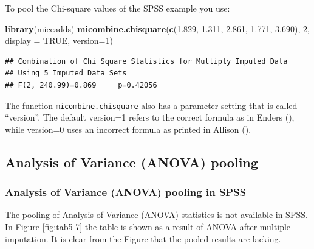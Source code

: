 \documentclass[
]{book}
\newenvironment{Shaded}{\begin{snugshade}}{\end{snugshade}}
\newcommand{\DataTypeTok}[1]{\textcolor[rgb]{0.13,0.29,0.53}{#1}}
\newcommand{\DecValTok}[1]{\textcolor[rgb]{0.00,0.00,0.81}{#1}}
\newcommand{\FloatTok}[1]{\textcolor[rgb]{0.00,0.00,0.81}{#1}}
\newcommand{\KeywordTok}[1]{\textcolor[rgb]{0.13,0.29,0.53}{\textbf{#1}}}
\newcommand{\NormalTok}[1]{#1}
\newcommand{\OtherTok}[1]{\textcolor[rgb]{0.56,0.35,0.01}{#1}}
\begin{document}
To pool the Chi-square values of the SPSS example you use:

\begin{Shaded}
\begin{Highlighting}[]
\KeywordTok{library}\NormalTok{(miceadds)}
\KeywordTok{micombine.chisquare}\NormalTok{(}\KeywordTok{c}\NormalTok{(}\FloatTok{1.829}\NormalTok{, }\FloatTok{1.311}\NormalTok{, }\FloatTok{2.861}\NormalTok{, }\FloatTok{1.771}\NormalTok{, }\FloatTok{3.690}\NormalTok{), }\DecValTok{2}\NormalTok{, }\DataTypeTok{display =} \OtherTok{TRUE}\NormalTok{, }\DataTypeTok{version=}\DecValTok{1}\NormalTok{)}
\end{Highlighting}
\end{Shaded}

\begin{verbatim}
## Combination of Chi Square Statistics for Multiply Imputed Data
## Using 5 Imputed Data Sets
## F(2, 240.99)=0.869     p=0.42056
\end{verbatim}

The function \texttt{micombine.chisquare} also has a parameter setting that is called ``version''. The default version=1 refers to the correct formula as in Enders (\citet{enders2010applied}), while version=0 uses an incorrect formula as printed in Allison (\citet{Allison2002}).

\hypertarget{analysis-of-variance-anova-pooling}{%
\subsection{Analysis of Variance (ANOVA) pooling}\label{analysis-of-variance-anova-pooling}}

\hypertarget{analysis-of-variance-anova-pooling-in-spss}{%
\subsubsection{Analysis of Variance (ANOVA) pooling in SPSS}\label{analysis-of-variance-anova-pooling-in-spss}}

The pooling of Analysis of Variance (ANOVA) statistics is not available in SPSS. In Figure \ref{fig:tab5-7} the table is shown as a result of ANOVA after multiple imputation. It is clear from the Figure that the pooled results are lacking.
\end{document}
